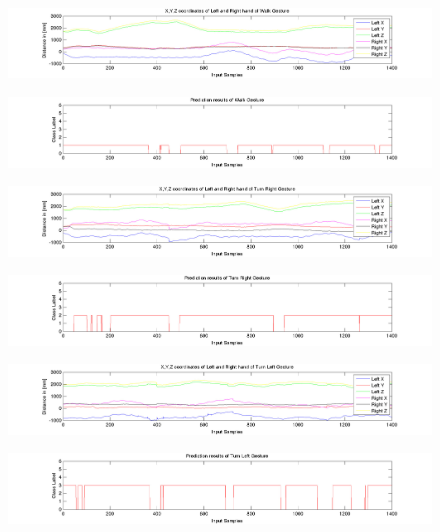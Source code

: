 \begin{figure}
	[h] 	
	\centerline{\includegraphics[width=180mm]{figures/result/test-axis-walk.jpg}}
\end{figure}
\begin{figure}
	[h] 	
	\centerline{\includegraphics[width=180mm]{figures/result/test-prediction-walk.jpg}}
\end{figure}
\begin{figure}
	[h] 	
	\centerline{\includegraphics[width=180mm]{figures/result/test-axis-turn-right.jpg}}
\end{figure}
\begin{figure}
	[h] 	
	\centerline{\includegraphics[width=180mm]{figures/result/test-prediction-turn-right.jpg}}
\end{figure}
\begin{figure}
	[h]
	\centerline{\includegraphics[width=180mm]{figures/result/test-axis-turn-left.jpg}}
\end{figure}
\label{ev:test:prediction}
\begin{figure}
	[h]
	\centerline{\includegraphics[width=180mm]{figures/result/test-prediction-turn-left.jpg}}
\end{figure}
